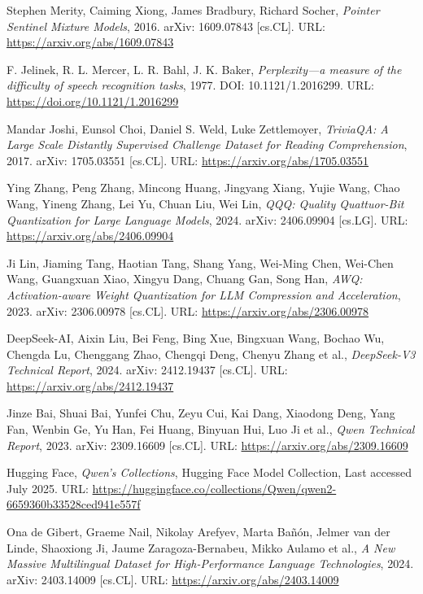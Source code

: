 \begin{thebibliography}{9}
	Stephen Merity, Caiming Xiong, James Bradbury, Richard Socher,
	\textit{Pointer Sentinel Mixture Models},
	2016. arXiv: 1609.07843 [cs.CL]. URL: \url{https://arxiv.org/abs/1609.07843}

	F. Jelinek, R. L. Mercer, L. R. Bahl, J. K. Baker,
	\textit{Perplexity—a measure of the difficulty of speech recognition tasks},
	1977. DOI: 10.1121/1.2016299. URL: \url{https://doi.org/10.1121/1.2016299}

	Mandar Joshi, Eunsol Choi, Daniel S. Weld, Luke Zettlemoyer,
	\textit{TriviaQA: A Large Scale Distantly Supervised Challenge Dataset for Reading Comprehension},
	2017. arXiv: 1705.03551 [cs.CL]. URL: \url{https://arxiv.org/abs/1705.03551}

	Ying Zhang, Peng Zhang, Mincong Huang, Jingyang Xiang, Yujie Wang, Chao Wang, Yineng Zhang, Lei Yu, Chuan Liu, Wei Lin,
	\textit{QQQ: Quality Quattuor-Bit Quantization for Large Language Models},
	2024. arXiv: 2406.09904 [cs.LG]. URL: \url{https://arxiv.org/abs/2406.09904}

	Ji Lin, Jiaming Tang, Haotian Tang, Shang Yang, Wei-Ming Chen, Wei-Chen Wang, Guangxuan Xiao, Xingyu Dang, Chuang Gan, Song Han,
	\textit{AWQ: Activation-aware Weight Quantization for LLM Compression and Acceleration},
	2023. arXiv: 2306.00978 [cs.CL]. URL: \url{https://arxiv.org/abs/2306.00978}

	DeepSeek-AI, Aixin Liu, Bei Feng, Bing Xue, Bingxuan Wang, Bochao Wu, Chengda Lu, Chenggang Zhao, Chengqi Deng, Chenyu Zhang et al.,
	\textit{DeepSeek-V3 Technical Report},
	2024. arXiv: 2412.19437 [cs.CL]. URL: \url{https://arxiv.org/abs/2412.19437}

	Jinze Bai, Shuai Bai, Yunfei Chu, Zeyu Cui, Kai Dang, Xiaodong Deng, Yang Fan, Wenbin Ge, Yu Han, Fei Huang, Binyuan Hui, Luo Ji et al.,
	\textit{Qwen Technical Report},
	2023. arXiv: 2309.16609 [cs.CL]. URL: \url{https://arxiv.org/abs/2309.16609}

	Hugging Face,
	\textit{Qwen's Collections},
	Hugging Face Model Collection, Last accessed July 2025. URL: \url{https://huggingface.co/collections/Qwen/qwen2-6659360b33528ced941e557f}

	Ona de Gibert, Graeme Nail, Nikolay Arefyev, Marta Bañón, Jelmer van der Linde, Shaoxiong Ji, Jaume Zaragoza-Bernabeu, Mikko Aulamo et al.,
	\textit{A New Massive Multilingual Dataset for High-Performance Language Technologies},
	2024. arXiv: 2403.14009 [cs.CL]. URL: \url{https://arxiv.org/abs/2403.14009}


\end{thebibliography}
